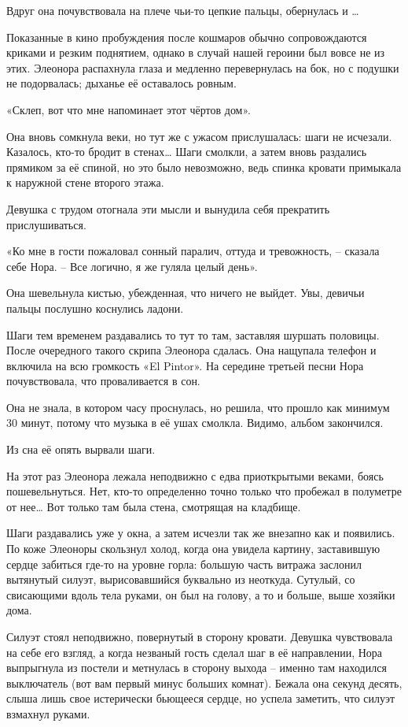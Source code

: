 \documentclass[
  a5paperpaper,
  DIV=11,
  numbers=noendperiod]{scrreprt}
\begin{document}
Вдруг она почувствовала на плече чьи-то цепкие пальцы, обернулась и
\ldots{}

Показанные в кино пробуждения после кошмаров обычно сопровождаются
криками и резким поднятием, однако в случай нашей героини был вовсе не
из этих. Элеонора распахнула глаза и медленно перевернулась на бок, но с
подушки не подорвалась; дыханье её оставалось ровным.

«Склеп, вот что мне напоминает этот чёртов дом».

Она вновь сомкнула веки, но тут же с ужасом прислушалась: шаги не
исчезали. Казалось, кто-то бродит в стенах\ldots{} Шаги смолкли, а затем
вновь раздались прямиком за её спиной, но это было невозможно, ведь
спинка кровати примыкала к наружной стене второго этажа.

Девушка с трудом отогнала эти мысли и вынудила себя прекратить
прислушиваться.

«Ко мне в гости пожаловал сонный паралич, оттуда и тревожность, --
сказала себе Нора. -- Все логично, я же гуляла целый день».

Она шевельнула кистью, убежденная, что ничего не выйдет. Увы, девичьи
пальцы послушно коснулись ладони.

Шаги тем временем раздавались то тут то там, заставляя шуршать половицы.
После очередного такого скрипа Элеонора сдалась. Она нащупала телефон и
включила на всю громкость «El Pintor». На середине третьей песни Нора
почувствовала, что проваливается в сон.

Она не знала, в котором часу проснулась, но решила, что прошло как
минимум 30 минут, потому что музыка в её ушах смолкла. Видимо, альбом
закончился.

Из сна её опять вырвали шаги.

На этот раз Элеонора лежала неподвижно с едва приоткрытыми веками, боясь
пошевельнуться. Нет, кто-то определенно точно только что пробежал в
полуметре от нее\ldots{} Вот только там была стена, смотрящая на
кладбище.

Шаги раздавались уже у окна, а затем исчезли так же внезапно как и
появились. По коже Элеоноры скользнул холод, когда она увидела картину,
заставившую сердце забиться где-то на уровне горла: большую часть
витража заслонил вытянутый силуэт, вырисовавшийся буквально из неоткуда.
Сутулый, со свисающими вдоль тела руками, он был на голову, а то и
больше, выше хозяйки дома.

Силуэт стоял неподвижно, повернутый в сторону кровати. Девушка
чувствовала на себе его взгляд, а когда незваный гость сделал шаг в её
направлении, Нора выпрыгнула из постели и метнулась в сторону выхода --
именно там находился выключатель (вот вам первый минус больших комнат).
Бежала она секунд десять, слыша лишь свое истерически бьющееся сердце,
но успела заметить, что силуэт взмахнул руками.
\end{document}
